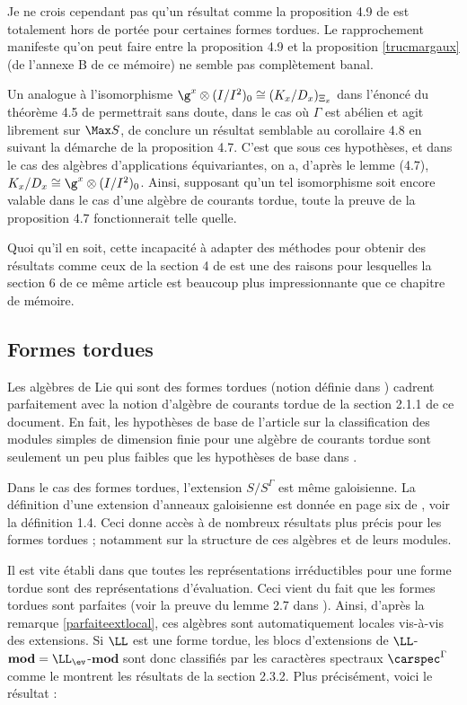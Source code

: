 \begin{Rem} Je ne crois cependant pas qu'un résultat comme la proposition 4.9 de \cite{NSext} est totalement hors de portée pour certaines formes tordues. Le rapprochement manifeste qu'on peut faire entre la proposition 4.9 et la proposition \ref{trucmargaux} (de l'annexe B de ce mémoire) ne semble pas complètement banal. 
\end{Rem}

Un analogue à l'isomorphisme $\g^x \otimes (I/I^2)_0 \cong (K_x/D_x)_{\Xi_x}$ dans l'énoncé du théorème 4.5 de \cite{NSext} permettrait sans doute, dans le cas où $\Gamma$ est abélien et agit librement sur $\Max S$, de conclure un résultat semblable au corollaire 4.8 en suivant la démarche de la proposition 4.7. C'est que sous ces hypothèses, et dans le cas des algèbres d'applications équivariantes, on a, d'après le lemme (4.7), $K_x/D_x \cong \g^x \otimes (I/I^2)_0$. Ainsi, supposant qu'un tel isomorphisme soit encore valable dans le cas d'une algèbre de courants tordue, toute la preuve de la proposition 4.7 fonctionnerait telle quelle.

Quoi qu'il en soit, cette incapacité à adapter des méthodes pour obtenir des résultats comme ceux de la section 4 de \cite{NSext} est une des raisons pour lesquelles la section 6 de ce même article est beaucoup plus impressionnante que ce chapitre de mémoire.  

%
\subsection{Formes tordues}
Les algèbres de Lie qui sont des formes tordues (notion définie dans \cite{LPtfa}) cadrent parfaitement avec la notion d'algèbre de courants tordue de la section 2.1.1 de ce document. En fait, les hypothèses de base de l'article \cite{LauTCA} sur la classification des modules simples de dimension finie pour une algèbre de courants tordue sont seulement un peu plus faibles que les hypothèses de base dans \cite{LPtfa}.

Dans le cas des formes tordues, l'extension $S/S^\Gamma$ est même galoisienne. La définition d'une extension d'anneaux galoisienne est donnée en page six de \cite{CHR}, voir la définition 1.4. Ceci donne accès à de nombreux résultats plus précis pour les formes tordues ; notamment sur la structure de ces algèbres et de leurs modules. 

Il est vite établi dans \cite{LPtfa} que toutes les représentations irréductibles pour une forme tordue sont des représentations d'évaluation. Ceci vient du fait que les formes tordues sont parfaites (voir la preuve du lemme 2.7 dans \cite{LPtfa}). Ainsi, d'après la remarque \ref{parfaiteextlocal}, ces algèbres sont automatiquement locales vis-à-vis des extensions. Si $\LL$ est une forme tordue, les blocs d'extensions de $\LL$-$\mathbf{mod} = \LL_{\ev}$-$\mathbf{mod}$ sont donc classifiés par les caractères spectraux $\carspec^\Gamma$ comme le montrent les résultats de la section 2.3.2. Plus précisément, voici le résultat : 

